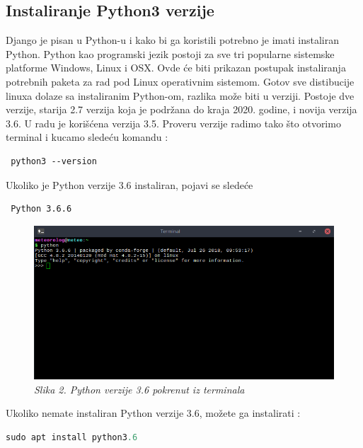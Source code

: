 \documentclass[12pt]{article}
\begin{document}
\subsection{Instaliranje Python3 verzije }
Django je pisan u Python-u i kako bi ga koristili potrebno je imati instaliran Python. Python kao programski jezik postoji za sve tri popularne sistemske platforme Windows, Linux i OSX. Ovde će biti prikazan postupak instaliranja potrebnih paketa za rad pod Linux operativnim sistemom. Gotov sve distibucije linuxa dolaze sa instaliranim Python-om, razlika može biti u verziji. Postoje dve verzije, starija 2.7 verzija koja je podržana do kraja 2020. godine, i novija verzija 3.6. U radu je korišćena verzija 3.5. Proveru verzije radimo tako što otvorimo terminal i kucamo sledeću komandu : 
\begin{lstlisting}
 python3 --version
\end{lstlisting}
Ukoliko je Python verzije 3.6 instaliran, pojavi se sledeće
\begin{lstlisting}
 Python 3.6.6
\end{lstlisting}
\begin{figure}[h!]
\centering
\includegraphics[width=0.8\linewidth]{python.png}
\caption*{\textsl{Slika 2. Python verzije 3.6 pokrenut iz terminala}}
\end{figure}
Ukoliko nemate instaliran Python verzije 3.6, možete ga instalirati :
\begin{lstlisting}[language=Python]
 sudo apt install python3.6 
\end{lstlisting}
\end{document}
